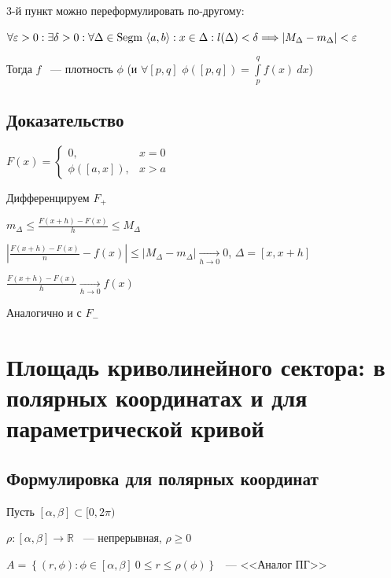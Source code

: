 \documentclass{article}
\begin{document}
            3-й пункт можно переформулировать по-другому:
            
            $\forall \varepsilon > 0 : \exists \delta > 0 : \forall \Delta \in \Segm \langle a, b \rangle : x \in \Delta : l(\Delta) < \delta \Longrightarrow \left| M_{\Delta} - m_{\Delta} \right| < \varepsilon$
        
            Тогда $f$ ~--- плотность $\phi$ (и $\forall [p, q]$ $\phi([p, q]) = \int\limits^q_p f(x) \ dx$)
        
        \subsection{Доказательство}
        
            $F(x) = \begin{cases} 0, & x = 0 \\ \phi([a, x]), & x > a \end{cases}$
        
            Дифференцируем $F_+$
        
            $m_{\Delta} \leq \frac{F(x+ h) - F(x)}{h} \leq M_{\Delta}$
        
            $\left| \frac{F(x + h) - F(x)}{n} - f(x) \right| \leq \left| M_{\Delta} - m_{\Delta} \right| \xrightarrow[h \rightarrow 0]{} 0$, $\Delta = [x, x + h]$
        
            $\frac{F(x + h) - F(x)}{h} \xrightarrow[h \rightarrow 0]{} f(x)$
        
            Аналогично и с $F_-$
        
    \newpage
    
    \section{Площадь криволинейного сектора: в полярных координатах и для параметрической кривой}
    
        \subsection{Формулировка для полярных координат}
            
            Пусть $[\alpha, \beta] \subset [0, 2 \pi)$
            
            $\rho : [\alpha, \beta] \rightarrow \mathbb{R}$ ~--- непрерывная, $\rho \geq 0$
            
            $A = \left\{ (r, \phi) : \phi \in [\alpha, \beta] \ 0 \leq r \leq \rho(\phi) \right\}$ ~--- <<Аналог ПГ>>
            
\end{document}
